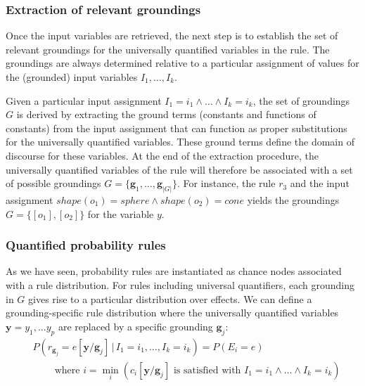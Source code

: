 

\subsubsection*{Extraction of relevant groundings}

Once the input variables are retrieved, the next step is to establish the set of relevant groundings for the universally quantified variables in the rule.  The groundings are always determined relative to a particular assignment of values for the (grounded) input variables $I_1, \dots, I_k$. 

Given a particular input assignment $I_1\!=\!i_1 \land \dots \land I_k\!=\!i_k$, the set of groundings $G$ is derived by extracting the ground terms (constants and functions of constants) from the input assignment that can function as proper substitutions for the universally quantified variables. These ground terms define the domain of discourse for these variables. At the end of the extraction procedure, the universally quantified variables of the rule will therefore be associated with a set of possible groundings $G = \{\mathbf{g}_1, \dots, \mathbf{g}_{|G|}\}$.  For instance, the rule $r_3$ and the input assignment $ \mathit{shape}(o_1)\!=\!\mathit{sphere} \land \mathit{shape}(o_2)\!=\!\mathit{cone}$ yields the groundings $G= \{[o_1], [o_2]\}$ for the variable $y$. 



\subsubsection*{Quantified probability rules}

As we have seen, probability rules are instantiated as chance nodes associated with a rule distribution.  For rules including universal quantifiers, each grounding in $G$ gives rise to a particular distribution over effects.   We can define a grounding-specific rule distribution where the universally quantified variables $\mathbf{y} = y_1,... y_p$ are replaced by a specific grounding $\mathbf{g}_j$:
\begin{align}
& P(r_{\mathbf{g}_j}\!=\!e [\mathbf{y} / \mathbf{g}_j] \, | \, I_1\!=\!i_1, \dots, I_k\!=\!i_k) = P(E_i = e) \label{eq:quantifruledistrib}
 \\
& \; \; \; \; \; \; \; \; \text{where } i = \min_i (c_i[\mathbf{y} / \mathbf{g}_j]\text{ is satisfied with } I_1\!=\!i_1 \land \dots \land I_k\!=\!i_k) \nonumber \end{align}

